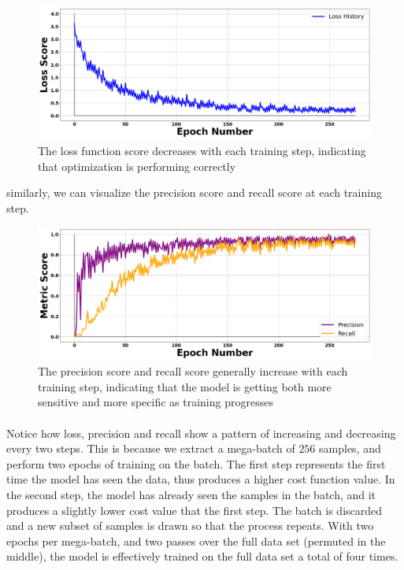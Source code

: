 \documentclass[12pt,letterpaper]{article}
\begin{document}
\begin{figure}[H]
\begin{center}
\includegraphics[scale=0.3]{../Figures/LossHistory}
\end{center}
\caption{The loss function score decreases with each training step, indicating that optimization is performing correctly}
\label{fig-LossScore}
\end{figure}
similarly, we can visualize the precision score and recall score at each training step.
\begin{figure}[H]
\begin{center}
\includegraphics[scale=0.3]{../Figures/MetricHistory}
\end{center}
\caption{The precision score and recall score generally increase with each training step, indicating that the model is getting both more sensitive and more specific as training progresses}
\label{fig-PrecisionRecallScores}
\end{figure}

\paragraph*{}Notice how loss, precision and recall show a pattern of increasing and decreasing every two steps. This is because we extract a mega-batch of $256$ samples, and perform two epochs of training on the batch. The first step represents the first time the model has seen the data, thus produces a higher cost function value. In the second step, the model has already seen the samples in the batch, and it produces a slightly lower cost value that the first step. The batch is discarded and a new subset of samples is drawn so that the process repeats. With two epochs per mega-batch, and two passes over the full data set (permuted in the middle), the model is effectively trained on the full data set a total of four times.
\end{document}
